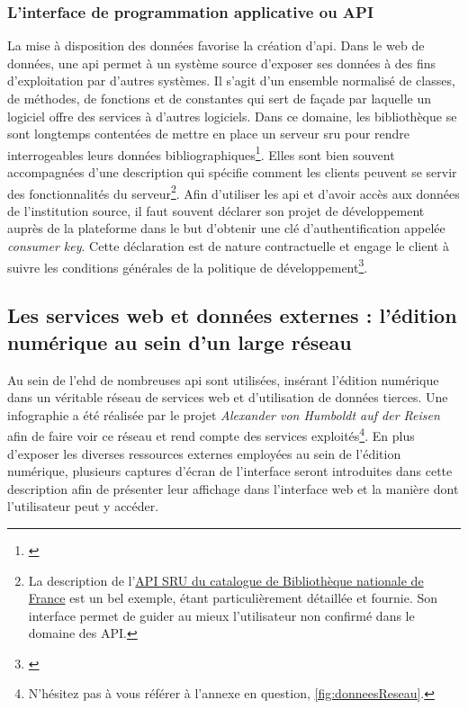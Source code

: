 \documentclass[a4paper, 12pt, twoside]{book}
\begin{document}
\subsubsection{L'interface de programmation applicative ou API}
La mise à disposition des données favorise la création d'\gls{api}. Dans le web de données, une \gls{api} permet à un système source d'exposer ses données à des fins d'exploitation par d'autres systèmes. Il s'agit d'un ensemble normalisé de classes, de méthodes, de fonctions et de constantes qui sert de façade par laquelle un logiciel offre des services à d'autres logiciels. 
Dans ce domaine, les bibliothèque se sont longtemps contentées de mettre en place un serveur \gls{sru} pour rendre interrogeables leurs données bibliographiques\footnote{\cite{tomic_usage_2014}}. Elles sont bien souvent accompagnées d'une description qui spécifie comment les clients peuvent se servir des fonctionnalités du serveur\footnote{La description de l'\href{https://api.bnf.fr/fr/api-sru-catalogue-general}{API SRU du catalogue de Bibliothèque nationale de France} est un bel exemple, étant particulièrement détaillée et fournie. Son interface permet de guider au mieux l'utilisateur non confirmé dans le domaine des API. }. Afin d'utiliser les \gls{api} et d'avoir accès aux données de l'institution source, il faut souvent déclarer son projet de développement auprès de la plateforme dans le but d'obtenir une clé d'authentification appelée \textit{consumer key}. Cette déclaration est de nature contractuelle et engage le client à suivre les conditions générales de la politique de développement\footnote{\cite{francony_leditorialisation_2018}}. 

\subsection{Les services web et données externes : l'édition numérique au sein d'un large réseau}
Au sein de l'\gls{ehd} de nombreuses \gls{api} sont utilisées, insérant l'édition numérique dans un véritable réseau de services web et d'utilisation de données tierces. Une infographie a été réalisée par le projet \textit{Alexander von Humboldt auf der Reisen} afin de faire voir ce réseau et rend compte des services exploités\footnote{N'hésitez pas à vous référer à l'annexe en question, \autoref{fig:donneesReseau}.}. En plus d'exposer les diverses ressources externes employées au sein de l'édition numérique, plusieurs captures d'écran de l'interface seront introduites dans cette description afin de présenter leur affichage dans l'interface web et la manière dont l'utilisateur peut y accéder.
\end{document}
